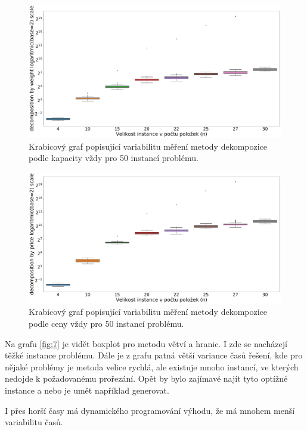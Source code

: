 \documentclass[11pt]{article}
\begin{document}
\begin{figure}[h]\centering
	\includegraphics[scale=0.2]{img/boxDW}
 	\caption[2]{Krabicový graf popisující variabilitu měření metody dekompozice podle kapacity vždy pro 50 instancí problému.}\label{fig:5}
 \end{figure} 	
 \begin{figure}[h]\centering
	\includegraphics[scale=0.2]{img/boxDC}
 	\caption[2]{Krabicový graf popisující variabilitu měření metody dekompozice podle ceny vždy pro 50 instancí problému.}\label{fig:6}
 \end{figure}

Na grafu \ref{fig:7} je vidět boxplot pro metodu větví a hranic. I zde se nacházejí těžké instance problému. Dále je z grafu patná větší variance časů řešení, kde pro nějaké problémy je metoda velice rychlá, ale existuje mnoho instancí, ve kterých nedojde k požadovanému prořezání. Opět by bylo zajímavé najít tyto optížné instance a nebo je umět například generovat.

I přes horší časy má dynamického programování výhodu, že má mnohem menší variabilitu časů.
\end{document}
